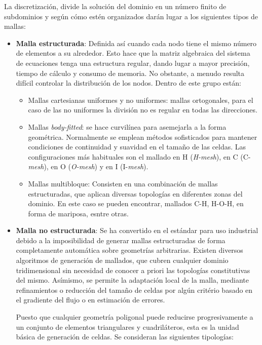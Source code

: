 La discretización, divide la solución del dominio en un número finito de
subdominios y según cómo estén organizados darán lugar a los siguientes
tipos de mallas:

\begin{itemize}
\item
  \textbf{Malla estructurada}: Definida así cuando cada nodo tiene el
  mismo número de elementos a su alrededor. Esto hace que la matriz
  algebraica del sistema de ecuaciones tenga una estructura regular,
  dando lugar a mayor precisión, tiempo de cálculo y consumo de memoria.
  No obstante, a menudo resulta difícil controlar la distribución de los
  nodos. Dentro de este grupo están:

  \begin{itemize}
  \item
    Mallas cartesianas uniformes y no uniformes: mallas ortogonales,
    para el caso de las no uniformes la división no es regular en todas
    las direcciones.
  \item
    Mallas \emph{body-fitted}: se hace curvilínea para asemejarla a la
    forma geométrica. Normalmente se emplean métodos sofisticados para
    mantener condiciones de continuidad y suavidad en el tamaño de las
    celdas. Las configuraciones más habituales son el mallado en H
    (\emph{H-mesh}), en C (C-\emph{mesh}), en O (\emph{O-mesh}) y en I
    (I-\emph{mesh}).
  \item
    Mallas multibloque: Consisten en una combinación de mallas
    estructuradas, que aplican diversas topologías en diferentes zonas
    del dominio. En este caso se pueden encontrar, mallados C-H, H-O-H,
    en forma de mariposa, esntre otras.
  \end{itemize}
\item
  \textbf{Malla no estructurada}: Se ha convertido en el estándar para
  uso industrial debido a la imposibilidad de generar mallas
  estructuradas de forma completamente automática sobre geometrías
  arbitrarias. Existen diversos algoritmos de generación de mallados,
  que cubren cualquier dominio tridimensional sin necesidad de conocer a
  priori las topologías constitutivas del mismo. Asímismo, se permite la
  adaptación local de la malla, mediante refinamientos o reducción del
  tamaño de celdas por algún critério basado en el gradiente del flujo o
  en estimación de errores.

  Puesto que cualquier geometría poligonal puede reducirse
  progresivamente a un conjunto de elementos triangulares y
  cuadriláteros, esta es la unidad básica de generación de celdas. Se
  consideran las siguientes tipologías:


\end{itemize}
